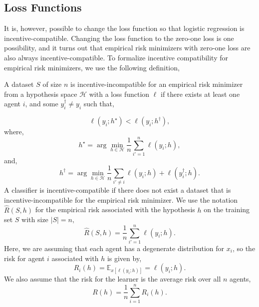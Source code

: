 \documentclass{article}
\begin{document}
\subsection{Loss Functions}
It is, however, possible to change the loss function so that logistic regression is incentive-compatible. Changing the loss function to the zero-one loss is one possibility, and it turns out that empirical risk minimizers with zero-one loss are also always incentive-compatible.
\newline \newline
To formalize incentive compatibility for empirical risk minimizers, we use the following definition,
\begin{df} \label{df:icerm} 
A dataset $S $ of size $n $ is incentive-incompatible for an empirical risk minimizer from a hypothesis space $\mathcal{H}$ with a loss function $\ell$ if there exists at least one agent $i $, and some $y^{\dagger}_{i} \neq  y_{i}$ such that,
\end{df}
\begin{equation} 
\ell\left(y_{i} ; h^\star \right) < \ell\left(y_{i} ; h^{\dagger}\right),
\end{equation}
where,
\begin{equation} 
h^\star  = \arg\displaystyle\min_{h \in \mathcal{H}} \dfrac{1}{n} \displaystyle\sum_{i' = 1}^{n} \ell\left(y_{i} ; h\right),
\end{equation}
and,
\begin{equation} 
h^{\dagger} = \arg\displaystyle\min_{h \in \mathcal{H}} \dfrac{1}{n} \displaystyle\sum_{i' \neq  i} \ell\left(y_{i} ; h\right) + \ell\left(y^{\dagger}_{i} ; h\right).
\end{equation}
A classifier is incentive-compatible if there does not exist a dataset that is incentive-incompatible for the empirical risk minimizer.
\newline \newline
We use the notation $\hat{R}\left(S, h \right)$ for the empirical risk associated with the hypothesis $h $ on the training set $S $ with size $\left| S \right| = n, $
\begin{equation} 
\hat{R}\left(S, h \right) = \dfrac{1}{n} \displaystyle\sum_{i' = 1}^{n} \ell\left(y_{i} ; h\right).
\end{equation}
Here, we are assuming that each agent has a degenerate distribution for $x_{i}$, so the risk for agent $i $ associated with $h $ is given by,
\begin{equation} 
R_{i}\left(h\right) = \mathbb{E}_{x\left[\ell\left(y_{i} ; h\right)\right]} = \ell\left(y_{i} ; h\right).
\end{equation}
We also assume that the risk for the learner is the average risk over all $n $ agents,
\begin{equation} 
R(h) = \dfrac{1}{n} \displaystyle\sum_{i=1}^{n} R_{i}\left(h\right).
\end{equation}
\end{document}
